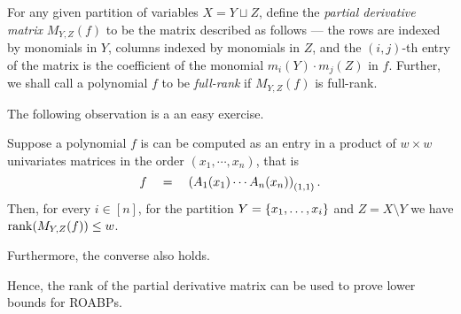 \begin{definition} \label{defn:pdm-commutative}
For any given partition of variables $X = Y \sqcup Z$, define the \emph{partial derivative matrix} $M_{Y,Z}(f)$ to be the matrix described as follows --- the rows are indexed by monomials in $Y$, columns indexed by monomials in $Z$, and the $(i,j)$-th entry of the matrix is the coefficient of the monomial $m_i(Y)\cdot m_j(Z)$ in $f$. 
Further, we shall call a polynomial $f$ to be \emph{full-rank} if $M_{Y,Z}(f)$ is full-rank.
\end{definition}


\medskip

\noindent
The following observation is a an easy exercise. 

\begin{lemma}
Suppose a polynomial $f$ is can be computed as an entry in a product of $w\times w$ univariates matrices in the order $(x_1,\cdots, x_n)$, that is
\[
f \quad = \quad \left(A_1(x_1) \cdots A_n(x_n) \right)_{(1,1)}.
\]
Then, for every $i \in [n]$, for the partition $Y = \left\{x_1, \ldots , x_{i}\right\}$ and $Z = X \setminus Y$ we have $\operatorname{rank}(M_{Y,Z}(f)) \leq w$. 

Furthermore, the converse also holds. 
\end{lemma}

Hence, the rank of the partial derivative matrix can be used to prove lower bounds for ROABPs. \\

